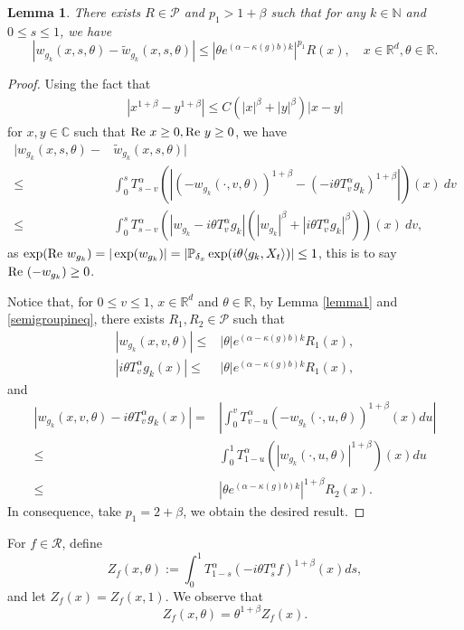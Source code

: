 \documentclass{article}
\newtheorem{lemma}{Lemma}[section]
\begin{document}
\begin{lemma}\label{lemma2}
There exists $R \in \mathcal{P}$ and $p_1 >1+\beta$ such that for any $k \in \mathbb{N}$ and $0\leq s \leq 1$, we have 
$$|w_{g_k}(x,s,\theta)-\tilde{w}_{g_k}(x,s,\theta)|\leq |\theta e^{(\alpha-\kappa(g)b)k}|^{p_1}R(x),\quad x\in \mathbb{R}^d,\theta\in \mathbb{R}.$$
\end{lemma}
\begin{proof}
 Using the fact that 
 \begin{align}
      |x^{1+\beta}-y^{1+\beta}|\leq C (|x|^{\beta}+|y|^{\beta})|x-y|\label{element}
 \end{align}
for $x,y \in \mathbb{C}$ such that ${\rm Re~} x \geq 0, {\rm Re~} y\geq 0$, we have
\begin{align*}
   |w_{g_k}(x,s,\theta)-&\tilde{w}_{g_k}(x,s,\theta)|\\
   \leq &\int_0^s T_{s-v}^{\alpha}\left(|(-w_{g_k}(\cdot,v,\theta))^{1+\beta}-(-i\theta T_v^{\alpha}g_k)^{1+\beta}|\right)(x)~dv\\
   \leq &\int_0^s T_{s-v}^{\alpha}\left( |w_{g_k}-i\theta T_v^{\alpha}g_{k}|\left(|w_{g_k}|^{\beta}+|i\theta T_v^{\alpha}g_k|^{\beta}\right)\right)(x)~dv, 
\end{align*}
as $\exp({\rm Re~}w_{g_k})=|\exp(w_{g_k})|=\left|\mathbb{P}_{\delta_x}\exp(i\theta \langle  g_k,X_t\rangle)\right|\leq 1$, this is to say ${\rm Re~}(-w_{g_k})\geq0$.

Notice that, for $0\leq v \leq 1$, $x\in \mathbb{R}^d$ and $\theta \in \mathbb{R}$, by Lemma \ref{lemma1} and \eqref{semigroupineq}, there exists $R_1,R_2\in \mathcal{P}$ such that
\begin{align*}
    |w_{g_{k}}(x,v,\theta)|\leq &|\theta|e^{(\alpha-\kappa(g)b)k}R_1(x),\\
    |i\theta T_v^{\alpha}g_k(x)|\leq & |\theta|e^{(\alpha-\kappa(g)b)k}R_1(x),
\end{align*}
and
\begin{align}
   |w_{g_{k}}(x,v,\theta)-i\theta T_v^{\alpha}g_k(x)|=&\left| \int_0^v T^{\alpha}_{v-u}(-w_{g_k}(\cdot,u,\theta))^{1+\beta}(x)du\right| \nonumber\\ 
   \leq & \int_0^1 T_{1-u}^{\alpha}(|w_{g_k}(\cdot,u,\theta)|^{1+\beta})(x)du \nonumber \\
   \leq & |\theta e^{(\alpha-\kappa(g)b)k}|^{1+\beta}R_2(x). \label{Zineq}
\end{align}
In consequence, take $p_1=2+\beta$, we obtain the desired result.
\end{proof}
For $f\in \mathcal{R}$, define 
$$Z_f(x,\theta):=\int_0^1 T^{\alpha}_{1-s}(-i\theta T_s^{\alpha}f)^{1+\beta}(x)ds ,$$
and let $Z_f(x)=Z_f(x,1)$. We observe that
\begin{equation}\label{zfunction}
    Z_f(x,\theta)=\theta^{1+\beta}Z_f(x).
\end{equation}
\end{document}
